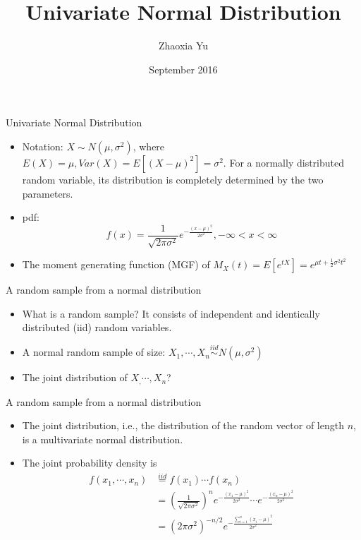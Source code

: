 \documentclass[landscape]{slides}
\title{Univariate Normal Distribution}
\author{Zhaoxia Yu}
\date{September 2016}
\begin{document}
\maketitle

\begin{slide}{\Large Univariate Normal Distribution}
\begin{itemize}
    \item Notation: $X\sim N(\mu, \sigma^2)$, where $E(X)=\mu, Var(X)=E[(X-\mu)^2]=\sigma^2$. For a normally distributed random variable, its distribution is completely determined by the two parameters.
    \item pdf: $$f(x)=\frac{1}{\sqrt{2\pi \sigma^2}}e^{-\frac{(x-\mu)^2}{2\sigma^2}}, -\infty <x <\infty$$
    \item The moment generating function (MGF) of
    $M_X(t)=E[e^{tX}]=e^{\mu t + \frac{1}{2} \sigma^2 t^2}$
\end{itemize}
\end{slide}

\begin{slide}{\Large A random sample from a normal distribution}
\begin{itemize}
    \item What is a random sample? It consists of independent and identically distributed (iid) random variables. 
    \item A normal random sample of size:
    $X_1,\cdots,X_n \overset{iid} \sim N(\mu,\sigma^2)$
    \item The joint distribution of $X_,\cdots,X_n$? 
\end{itemize}
\end{slide}

\begin{slide}{\Large A random sample from a normal distribution}
\begin{itemize}
    \item The joint distribution, i.e., the distribution of the random vector of length $n$, is a multivariate normal distribution. 
    \item The joint probability density is
    \begin{align*}
    f(x_1,\cdots,x_n) & \overset{iid} = f(x_1)\cdots f(x_n)\\
    & = \left( \frac{1}{\sqrt{2\pi \sigma^2}}\right)^n e^{-\frac{(x_1-\mu)^2}{2\sigma^2}} \cdots e^{-\frac{(x_n-\mu)^2}{2\sigma^2}}\\
    & = (2\pi \sigma^2)^{-n/2} e^{-\frac{\sum_{i=1}^n(x_i-\mu)^2}{2\sigma^2}}
    \end{align*}
\end{itemize}
\end{slide}
\end{document}
